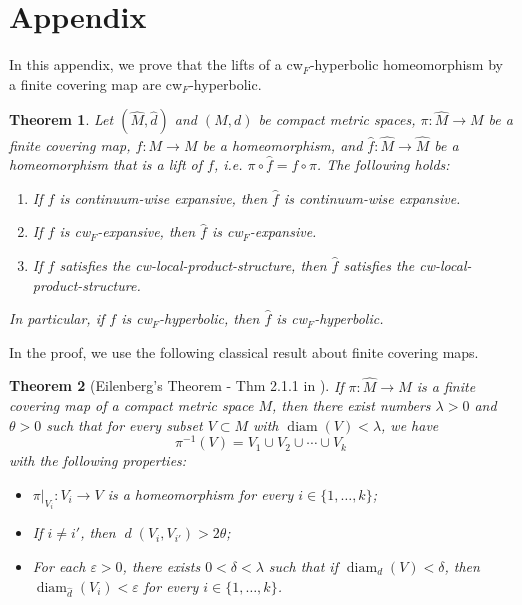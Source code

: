 \documentclass{amsart}
\theoremstyle{plain}
\newtheorem{theorem}{Theorem}[section]
\theoremstyle{definition}
\newcommand{\eps}{\varepsilon}
\newcommand{\dist}{\operatorname{\textit{d}}}
\newcommand{\diam}{\operatorname{diam}}
\begin{document}
\section{Appendix}

In this appendix, we prove that the lifts of a cw$_F$-hyperbolic homeomorphism by a finite covering map are cw$_F$-hyperbolic. 

\begin{theorem}\label{fincovcw}
Let $(\widehat M,\widehat d)$ and $(M,d)$ be compact metric spaces,
$\pi\colon\widehat M\to M$ be a finite covering map, $f\colon M\to M$ be a homeomorphism, and $\widehat f\colon \widehat M\to\widehat M$ be a homeomorphism that is a lift of $f$, i.e. $\pi\circ\widehat f=f\circ\pi$. The following holds:
\begin{enumerate}
\item If $f$ is continuum-wise expansive, then $\widehat f$ is continuum-wise expansive.
\item If $f$ is cw$_F$-expansive, then $\widehat f$ is cw$_F$-expansive.
\item If $f$ satisfies the cw-local-product-structure, then $\widehat f$ satisfies the cw-local-product-structure.
\end{enumerate}
In particular, if $f$ is cw$_F$-hyperbolic, then $\widehat f$ is cw$_F$-hyperbolic.
\end{theorem}

In the proof, we use the following classical result about finite covering maps.

\begin{theorem}[Eilenberg's Theorem - Thm 2.1.1 in \cite{AH}]
If $\pi\colon \widehat{M}\to M$ is a finite covering map of a compact metric space $M$, then there exist numbers $\lambda>0$ and $\theta>0$ such that for every subset $V\subset M$ with $\diam(V)<\lambda$, we have $$\pi^{-1}(V)=V_1\cup V_2\cup \cdots \cup V_k$$ with the following properties:

    \begin{itemize}
        \item $\pi\vert_{V_i}\colon V_i\to V$ is a homeomorphism for every $i\in\{1,\ldots,k\}$;
        \item If $i\neq i'$, then $\dist(V_i,V_{i'})>2\theta$;
        \item For each $\eps>0$, there exists $0<\delta<\lambda$ such that if $\diam_d(V)<\delta$, then $\diam_{\widehat d}(V_i)<\eps$ for every $i\in\{1,\ldots,k\}$.
    \end{itemize}
\end{theorem}
\end{document}
